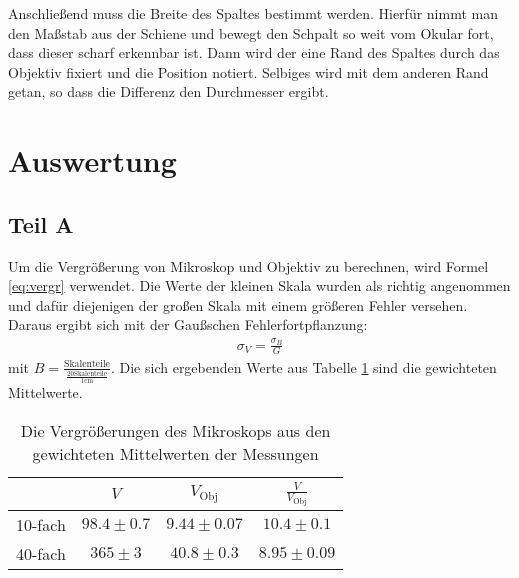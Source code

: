 \documentclass[12pt,a4paper,titlepage,headinclude,bibtotoc]{scrartcl}
\begin{document}
Anschließend muss die Breite des Spaltes bestimmt werden.
Hierfür nimmt man den Maßstab aus der Schiene und bewegt den Schpalt so weit vom Okular fort, dass dieser scharf erkennbar ist.
Dann wird der eine Rand des Spaltes  durch das Objektiv fixiert und die Position notiert.
Selbiges wird mit dem anderen Rand getan, so dass die Differenz den Durchmesser ergibt.



\section{Auswertung}
\label{sec:auswertung}
\subsection{Teil A}
Um die Vergrößerung von Mikroskop und Objektiv zu berechnen, wird Formel \eqref{eq:vergr} verwendet.
Die Werte der kleinen Skala wurden als richtig angenommen und dafür diejenigen der großen Skala mit einem größeren Fehler versehen.
Daraus ergibt sich mit der Gaußschen Fehlerfortpflanzung:
\begin{align*}
\sigma_V=\frac{\sigma_B}{G}
\end{align*}
mit $B=\frac{\text{Skalenteile}}{\frac{20\text{Skalenteile}}{1\si{\centi\metre}}}$.
Die sich ergebenden Werte aus Tabelle \ref{tab:vergr} sind die gewichteten Mittelwerte.
\begin{table}[!h]
\centering
\begin{tabular}{|c||c|c|c|}
\hline
 & $V$ & $V_\text{Obj}$ & $\frac{V}{V_\text{Obj}}$\\\hline\hline
10-fach & $98.4\pm0.7$ & $9.44\pm0.07$ & $10.4\pm 0.1$ \\\hline
40-fach & $365\pm 3$ & $40.8\pm 0.3$ &$8.95\pm0.09$ \\\hline
\end{tabular}
\caption{Die Vergrößerungen des Mikroskops aus den gewichteten Mittelwerten der Messungen}
\label{tab:vergr}
\end{table}
\end{document}
